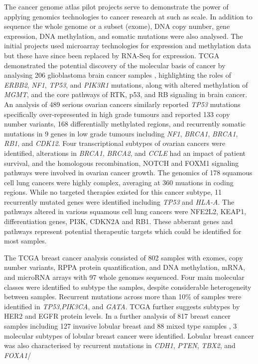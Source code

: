 The cancer genome atlas pilot projects \citep{TCGA2008GBM, TCGA2011OV, TCGA2012LUSC} serve to demonstrate the power of applying genomics technologies to cancer research at such as scale. In addition to sequence the whole genome or a subset (exome), DNA copy number, gene expression, DNA methylation, and somatic mutations were also analysed. The initial projects used microarray technologies for expression and methylation data but these have since been replaced by RNA-Seq for expression. TCGA demonstrated the potential discovery of the molecular basis of cancer by analysing 206 glioblastoma brain cancer samples \citep{TCGA2008GBM}, highlighting the roles of \textit{ERBB2}, \textit{NF1}, \textit{TP53}, and \textit{PIK3R1} mutations, along with altered methylation of \textit{MGMT}, and the core pathways of RTK, p53, and RB signaling in brain cancer.  An analysis of 489 serious ovarian cancers \citep{TCGA2011OV} similarly reported \textit{TP53} mutations specifically over-represented in high grade tumours and reported 133 copy number variants, 168 differentially methylated regions, and recurrently somatic mutations in 9 genes in low grade tumours including \textit{NF1},  \textit{BRCA1}, \textit{BRCA1}, \textit{RB1}, and \textit{CDK12}. Four transcriptional subtypes of ovarian cancers were identified, alterations in \textit{BRCA1}, \textit{BRCA2}, and \textit{CCLE} had an impact of patient survival, and the homologous recombination, NOTCH and FOXM1 signaling pathways were involved in ovarian cancer growth. The genomics of 178 squamous cell lung cancers \citep{TCGA2012LUSC} were highly complex, averaging at 360 muations in coding regions. While no targeted therapies existed for this cancer subtype, 11 recurrently mutated genes were identified including \textit{TP53} and \textit{HLA-A}. The pathways altered in various squamous cell lung cancers were NFE2L2, KEAP1, differentiation genes, PI3K, CDKN2A and RB1. These abberant genes and pathways represent potential therapeutic targets which could be identified for most samples.

The TCGA breast cancer analysis \citep{TCGA2012} consisted of 802 samples with exomes, copy number variants, RPPA protein quantification, and DNA methylation, mRNA, and microRNA arrays with 97 whole genomes sequenced. Four main molecular classes were identified to subtype the samples, despite considerable heterogeneity between samples. Recurrent mutations across more than 10\% of samples were identified in \textit{TP53},\textit{PIK3CA}, and \textit{GATA}. TCGA further suggests subtypes by HER2 and EGFR protein levels. In a further analysis of 817 breast cancer samples including 127 invasive lobular breast and 88 mixed type samples \citep{TCGA2015LBC}, 3 molecular subtypes of lobular breast cancer were identified. Lobular breast cancer was also characterised by recurrent mutations in \textit{CDH1}, \textit{PTEN}, \textit{TBX2}, and \textit{FOXA1}/

